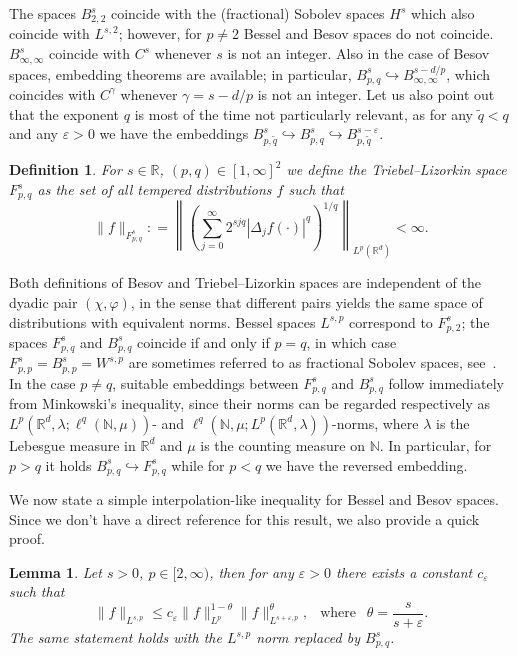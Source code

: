 \documentclass[10pt]{article}
\newcommand{\tmop}[1]{\ensuremath{\operatorname{#1}}}
\newtheorem{definition}{Definition}
\newtheorem{lemma}{Lemma}
\begin{document}
The spaces $B^s_{2, 2}$ coincide with the (fractional) Sobolev spaces $H^s$
which also coincide with $L^{s, 2}$; however, for $p \neq 2$ Bessel and Besov
spaces do not coincide. $B^s_{\infty, \infty}$ coincide with $C^s$ whenever
$s$ is not an integer. Also in the case of Besov spaces, embedding theorems
are available; in particular, $B^s_{p, q} \hookrightarrow B^{s - d /
p}_{\infty, \infty}$, which coincides with $C^{\gamma}$ whenever $\gamma = s -
d / p$ is not an integer. Let us also point out that the exponent $q$ is most
of the time not particularly relevant, as for any $\tilde{q} < q$ and any
$\varepsilon > 0$ we have the embeddings $B^s_{p, \tilde{q}} \hookrightarrow
B^s_{p, q} \hookrightarrow B^{s - \varepsilon}_{p, \tilde{q}}$.

\begin{definition}
  \label{appendixA2 defn triebel}For $s \in \mathbb{R}$, $(p, q) \in [1,
  \infty]^2$ we define the Triebel--Lizorkin space $F^s_{p, q}$ as the set of
  all tempered distributions $f$ such that
  \[ \| f \|_{F^s_{p, q}} : = \left\| \left( \sum_{j = 0}^{\infty} 2^{s j q} |
     \Delta_j f (\cdot) |^q \right)^{1 / q} \right\|_{L^p (\mathbb{R}^d)} <
     \infty . \]
\end{definition}

Both definitions of Besov and Triebel--Lizorkin spaces are independent of the
dyadic pair $(\chi, \varphi)$, in the sense that different pairs yields the
same space of distributions with equivalent norms. Bessel spaces $L^{s, p}$
correspond to $F^s_{p, 2}$; the spaces $F^s_{p, q}$ and $B^s_{p, q}$ coincide
if and only if $p = q$, in which case $F^s_{p, p} = B^s_{p, p} = W^{s, p}$ are
sometimes referred to as fractional Sobolev spaces, see~{\cite{dinezza}}. In
the case $p \neq q$, suitable embeddings between $F^s_{p, q}$ and $B^s_{p, q}$
follow immediately from Minkowski's inequality, since their norms can be
regarded respectively as $L^p (\mathbb{R}^d, \lambda ; \ell^q (\mathbb{N},
\mu))$\mbox{-} and $\ell^q (\mathbb{N}, \mu ; L^p (\mathbb{R}^d,
\lambda))$\mbox{-}norms, where $\lambda$ is the Lebesgue measure in
$\mathbb{R}^d$ and $\mu$ is the counting measure on $\mathbb{N}$. In
particular, for $p > q$ it holds $B^s_{p, q} \hookrightarrow F^s_{p, q}$ while
for $p < q$ we have the reversed embedding.

We now state a simple interpolation-like inequality for Bessel and Besov
spaces. Since we don't have a direct reference for this result, we also
provide a quick proof.

\begin{lemma}
  \label{appendixA2 interpolation inequality}Let $s > 0$, $p \in [2, \infty)$,
  then for any $\varepsilon > 0$ there exists a constant $c_{\varepsilon}$
  such that
  \[ \| f \|_{L^{s, p}} \leqslant c_{\varepsilon} \| f \|_{L^p}^{1 - \theta}
     \| f \|_{L^{s + \varepsilon, p}}^{\theta}, \enspace \tmop{where} \enspace
     \theta = \frac{s}{s + \varepsilon} . \]
  The same statement holds with the $L^{s, p}$ norm replaced by $B^s_{p, q}$.
\end{lemma}
\end{document}
